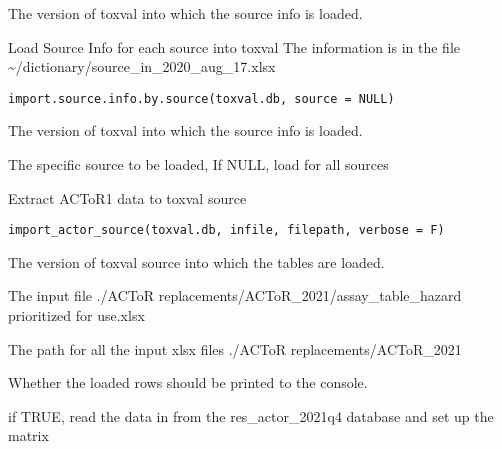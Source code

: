 \documentclass[letterpaper]{book}
\begin{document}
%
\begin{Arguments}
\begin{ldescription}
\item[\code{toxval.db}] The version of toxval into which the source info is loaded.
\end{ldescription}
\end{Arguments}
%
\begin{Description}\relax
Load Source Info for each source into toxval
The information is in the file \textasciitilde{}/dictionary/source\_in\_2020\_aug\_17.xlsx
\end{Description}
%
\begin{Usage}
\begin{verbatim}
import.source.info.by.source(toxval.db, source = NULL)
\end{verbatim}
\end{Usage}
%
\begin{Arguments}
\begin{ldescription}
\item[\code{toxval.db}] The version of toxval into which the source info is loaded.

\item[\code{source}] The specific source to be loaded, If NULL, load for all sources
\end{ldescription}
\end{Arguments}
%
\begin{Description}\relax
Extract ACToR1 data to toxval source
\end{Description}
%
\begin{Usage}
\begin{verbatim}
import_actor_source(toxval.db, infile, filepath, verbose = F)
\end{verbatim}
\end{Usage}
%
\begin{Arguments}
\begin{ldescription}
\item[\code{toxval.db}] The version of toxval source into which the tables are loaded.

\item[\code{infile}] The input file ./ACToR replacements/ACToR\_2021/assay\_table\_hazard prioritized for use.xlsx

\item[\code{filepath}] The path for all the input xlsx files ./ACToR replacements/ACToR\_2021

\item[\code{verbose}] Whether the loaded rows should be printed to the console.

\item[\code{do.init}] if TRUE, read the data in from the res\_actor\_2021q4 database and set up the matrix
\end{ldescription}
\end{Arguments}
\end{document}

